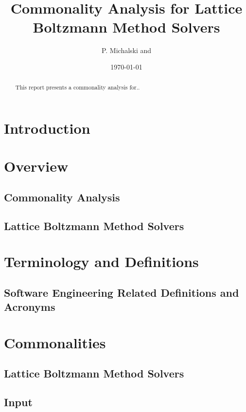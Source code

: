 \documentclass[12pt]{article}
\begin{document}
\title{Commonality Analysis for Lattice Boltzmann Method Solvers} 
\author{P. Michalski and}
\date{\today}

\begin{titlepage}
	\maketitle
	\begin{abstract}
		This report presents a commonality analysis for..
	\end{abstract}
\end{titlepage}


\newpage

\tableofcontents

\newpage


\section{Introduction}
\newpage
\section{Overview}
\subsection{Commonality Analysis}
\subsection{Lattice Boltzmann Method Solvers}
\newpage
\section{Terminology and Definitions}
\subsection{Software Engineering Related Definitions and Acronyms}
\newpage
\section{Commonalities}
\subsection{Lattice Boltzmann Method Solvers}
\subsection{Input}
\end{document}

